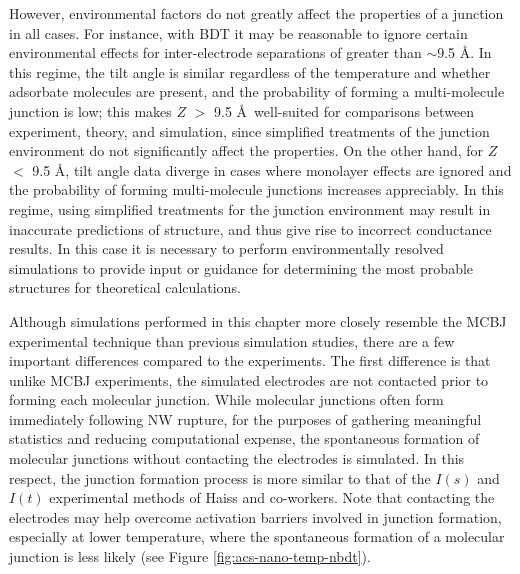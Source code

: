 \documentclass[10pt]{report}  %
\begin{document}
However, environmental factors do not greatly affect the properties of a junction in all cases.  For instance, with BDT it may be reasonable to ignore certain environmental effects for inter-electrode separations of greater than $\sim$9.5 \AA.  In this regime, the tilt angle is similar regardless of the temperature and whether adsorbate molecules are present, and the probability of forming a multi-molecule junction is low; this makes $Z$ $>$ 9.5 \AA\ well-suited for comparisons between experiment, theory, and simulation, since simplified treatments of the junction environment do not significantly affect the properties.  On the other hand, for $Z$ $<$ 9.5 \AA, tilt angle data diverge in cases where monolayer effects are ignored and the probability of forming multi-molecule junctions increases appreciably.  In this regime, using simplified treatments for the junction environment may result in inaccurate predictions of structure, and thus give rise to incorrect conductance results.  In this case it is necessary to perform environmentally resolved simulations to provide input or guidance for determining the most probable structures for theoretical calculations.  

Although simulations performed in this chapter more closely resemble the MCBJ experimental technique than previous simulation studies, there are a few important differences compared to the experiments.  The first difference is that unlike MCBJ experiments, the simulated electrodes are not contacted prior to forming each molecular junction.  While molecular junctions often form immediately following NW rupture, for the purposes of gathering meaningful statistics and reducing computational expense, the spontaneous formation of molecular junctions without contacting the electrodes is simulated.  In this respect, the junction formation process is more similar to that of the $I(s)$ and $I(t)$ experimental methods of Haiss and co-workers.\cite{Haiss:2006,Haiss:2008,Haiss:2009}  Note that contacting the electrodes may help overcome activation barriers involved in junction formation, especially at lower temperature, where the spontaneous formation of a molecular junction is less likely (see Figure \ref{fig:acs-nano-temp-nbdt}). 
\end{document}
